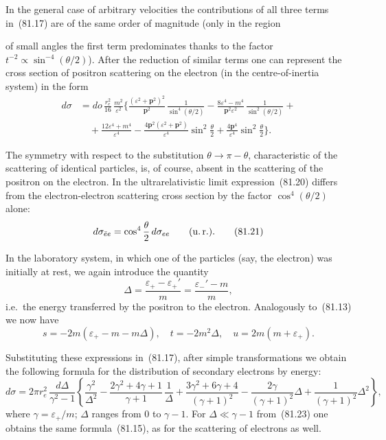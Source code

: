 In the general case of arbitrary velocities the contributions of all three terms in~(81.17) are of the same order of magnitude (only in the region

of small angles the first term predominates thanks to the factor $t^{-2} \propto \sin^{-4}(\theta/2)$). After the reduction of similar terms one can represent the cross section of positron scattering on the electron (in the centre-of-inertia system) in the form
\begin{equation}
\begin{split}
d\sigma &= do\,\frac{r_e^2}{16}\,\frac{m^2}{\varepsilon^2}\bigg\{\frac{(\varepsilon^2+\mathbf{p}^2)^2}{\mathbf{p}^2}\,\frac{1}{\sin^4(\theta/2)}-\frac{8\varepsilon^4-m^4}{\mathbf{p}^2\varepsilon^2}\,\frac{1}{\sin^2(\theta/2)}+{}\\
&\quad+\frac{12\varepsilon^4+m^4}{\varepsilon^4}-\frac{4\mathbf{p}^2(\varepsilon^2+\mathbf{p}^2)}{\varepsilon^4}\sin^2\frac{\theta}{2}+\frac{4\mathbf{p}^4}{\varepsilon^4}\sin^2\frac{\theta}{2}\bigg\}.
\end{split}
\tag{81.20}
\end{equation}

The symmetry with respect to the substitution $\theta \to \pi - \theta$, characteristic of the scattering of identical particles, is, of course, absent in the scattering of the positron on the electron. In the ultrarelativistic limit expression~(81.20) differs from the electron-electron scattering cross section by the factor $\cos^4(\theta/2)$ alone:
\begin{equation}
d\sigma_{\bar{e}e} = \cos^4\frac{\theta}{2}\,d\sigma_{ee}\qquad\text{(u.\,r.)}.
\tag{81.21}
\end{equation}

In the laboratory system, in which one of the particles (say, the electron) was initially at rest, we again introduce the quantity
\begin{equation}
\Delta = \frac{\varepsilon_+ - \varepsilon_+'}{m} = \frac{\varepsilon_-' - m}{m},
\tag{81.22}
\end{equation}
i.e.\ the energy transferred by the positron to the electron. Analogously to~(81.13) we now have
\[
s = -2m(\varepsilon_+ - m - m\Delta),\quad t = -2m^2\Delta,\quad u = 2m(m + \varepsilon_+).
\]

Substituting these expressions in~(81.17), after simple transformations we obtain the following formula for the distribution of secondary electrons by energy:
\begin{equation}
d\sigma = 2\pi r_e^2\,\frac{d\Delta}{\gamma^2-1}\left\{\frac{\gamma^2}{\Delta^2}-\frac{2\gamma^2+4\gamma+1}{\gamma+1}\,\frac{1}{\Delta}+\frac{3\gamma^2+6\gamma+4}{(\gamma+1)^2}-\frac{2\gamma}{(\gamma+1)^2}\Delta+\frac{1}{(\gamma+1)^2}\Delta^2\right\},
\tag{81.23}
\end{equation}
where $\gamma = \varepsilon_+/m$; $\Delta$ ranges from $0$ to $\gamma - 1$. For $\Delta \ll \gamma - 1$ from~(81.23) one obtains the same formula~(81.15), as for the scattering of electrons as well.

